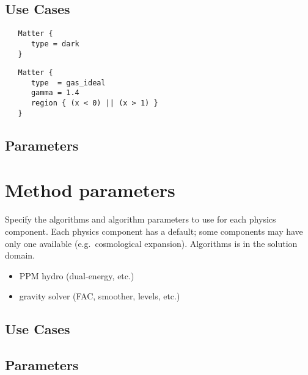 \documentclass{book}
\begin{document}
\subsection{Use Cases}

\begin{verbatim}
   Matter {
      type = dark
   }
\end{verbatim}

\begin{verbatim}
   Matter {
      type  = gas_ideal
      gamma = 1.4
      region { (x < 0) || (x > 1) }
   }
\end{verbatim}
\subsection{Parameters}

\section{Method parameters} \label{s:method}

 Specify the algorithms and algorithm parameters
 to use for each physics component.  Each physics component has a
 default; some components may have only one available
 (e.g.~cosmological expansion).  Algorithms is in the solution domain.

\begin{itemize}
\item PPM hydro (dual-energy, etc.)
\item gravity solver (FAC, smoother, levels, etc.)
\end{itemize}

\subsection{Use Cases}
\subsection{Parameters}
\end{document}

